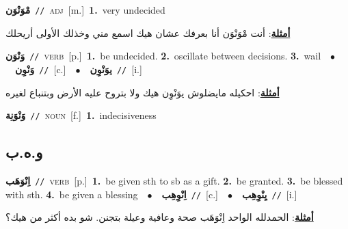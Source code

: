 \documentclass[10pt,a4paper,twoside]{article} %
\begin{document}
\begin{multicols}{2}
{\setlength\topsep{0pt}\textbf{\foreignlanguage{arabic}{مْوَنْوَن}}\ {\color{gray}\texttt{//}\color{black}}\ \textsc{adj}\ [m.]\ \textbf{1.}~very undecided\  \begin{flushright}\color{gray}\foreignlanguage{arabic}{\textbf{\underline{\foreignlanguage{arabic}{أمثلة}}}: أنت مْوَنْوَن أنا بعرفك عشان هيك اسمع مني وخذلك الأولى أريحلك}\end{flushright}\color{black}} \vspace{2mm}

{\setlength\topsep{0pt}\textbf{\foreignlanguage{arabic}{وَنْوَن}}\ {\color{gray}\texttt{//}\color{black}}\ \textsc{verb}\ [p.]\ \textbf{1.}~be undecided.  \textbf{2.}~oscillate between decisions.  \textbf{3.}~wail\ \ $\bullet$\ \ \setlength\topsep{0pt}\textbf{\foreignlanguage{arabic}{وَنْوِن}}\ {\color{gray}\texttt{//}\color{black}}\ [c.]\ \ $\bullet$\ \ \setlength\topsep{0pt}\textbf{\foreignlanguage{arabic}{يوَنْوِن}}\ {\color{gray}\texttt{//}\color{black}}\ [i.]\  \begin{flushright}\color{gray}\foreignlanguage{arabic}{\textbf{\underline{\foreignlanguage{arabic}{أمثلة}}}: احكيله مايضلوش يوَنْوِن هيك ولا بتروح عليه الأرض وبتنباع لغيره}\end{flushright}\color{black}} \vspace{2mm}

{\setlength\topsep{0pt}\textbf{\foreignlanguage{arabic}{وَنْوَنِة}}\ {\color{gray}\texttt{//}\color{black}}\ \textsc{noun}\ [f.]\ \textbf{1.}~indecisiveness\ } \vspace{2mm}

\vspace{-3mm}
\subsection*{\color{blue}\foreignlanguage{arabic}{و.ه.ب}\color{blue}{}} 

{\setlength\topsep{0pt}\textbf{\foreignlanguage{arabic}{اِنْوَهَب}}\ {\color{gray}\texttt{//}\color{black}}\ \textsc{verb}\ [p.]\ \textbf{1.}~be given sth to sb as a gift.  \textbf{2.}~be granted.  \textbf{3.}~be blessed with sth.  \textbf{4.}~be given a blessing\ \ $\bullet$\ \ \setlength\topsep{0pt}\textbf{\foreignlanguage{arabic}{اِنْوِهِب}}\ {\color{gray}\texttt{//}\color{black}}\ [c.]\ \ $\bullet$\ \ \setlength\topsep{0pt}\textbf{\foreignlanguage{arabic}{يِنْوِهِب}}\ {\color{gray}\texttt{//}\color{black}}\ [i.]\  \begin{flushright}\color{gray}\foreignlanguage{arabic}{\textbf{\underline{\foreignlanguage{arabic}{أمثلة}}}: الحمدلله الواحد اِنْوَهَب صحة وعافية وعيلة بتجنن. شو بده أكثر من هيك؟}\end{flushright}\color{black}} \vspace{2mm}


\end{multicols}
\end{document}
